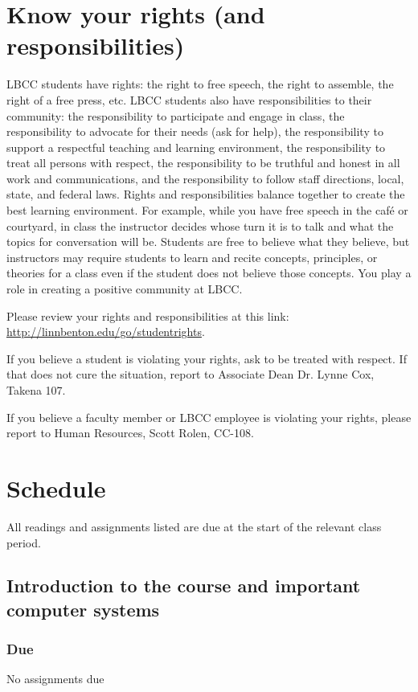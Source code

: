 \documentclass[12pt,article,oneside]{memoir}
\begin{document}
\section{Know your rights (and responsibilities)}

LBCC students have rights: the right to free speech, the right to assemble, the right of a free press, etc. LBCC students also have responsibilities to their community: the responsibility to participate and engage in class, the responsibility to advocate for their needs (ask for help), the responsibility to support a respectful teaching and learning environment, the responsibility to treat all persons with respect, the responsibility to be truthful and honest in all work and communications, and the responsibility to follow staff directions, local, state, and federal laws. Rights and responsibilities balance together to create the best learning environment. For example, while you have free speech in the caf\'{e} or courtyard, in class the instructor decides whose turn it is to talk and what the topics for conversation will be. Students are free to believe what they believe, but instructors may require students to learn and recite concepts, principles, or theories for a class even if the student does not believe those concepts. You play a role in creating a positive community at LBCC. 

Please review your rights and responsibilities at this link: \url{http://linnbenton.edu/go/studentrights}.

If you believe a student is violating your rights, ask to be treated with respect. If that does not cure the situation, report to Associate Dean Dr. Lynne Cox, Takena 107.

If you believe a faculty member or LBCC employee is violating your rights, please report to Human Resources, Scott Rolen, CC-108.

\newpage

\section{Schedule}

All readings and assignments listed are due at the start of the relevant class period.

\subsection{Introduction to the course and important computer systems}

\subsubsection{Due}
No assignments due
\end{document}
